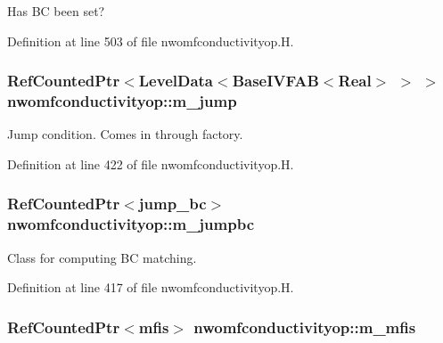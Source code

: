 Has BC been set? 



Definition at line 503 of file nwomfconductivityop.\+H.

\subsubsection[{\texorpdfstring{m\+\_\+jump}{m_jump}}]{\setlength{\rightskip}{0pt plus 5cm}Ref\+Counted\+Ptr$<$Level\+Data$<$Base\+I\+V\+F\+AB$<$Real$>$ $>$ $>$ nwomfconductivityop\+::m\+\_\+jump\hspace{0.3cm}{\ttfamily [protected]}}\hypertarget{classnwomfconductivityop_a094701273aec439e9e0965cedbc348a9}{}\label{classnwomfconductivityop_a094701273aec439e9e0965cedbc348a9}


Jump condition. Comes in through factory. 



Definition at line 422 of file nwomfconductivityop.\+H.

\subsubsection[{\texorpdfstring{m\+\_\+jumpbc}{m_jumpbc}}]{\setlength{\rightskip}{0pt plus 5cm}Ref\+Counted\+Ptr$<${\bf jump\+\_\+bc}$>$ nwomfconductivityop\+::m\+\_\+jumpbc\hspace{0.3cm}{\ttfamily [protected]}}\hypertarget{classnwomfconductivityop_a5a38584a144ef9dffa3c8e0c67dd1ca0}{}\label{classnwomfconductivityop_a5a38584a144ef9dffa3c8e0c67dd1ca0}


Class for computing BC matching. 



Definition at line 417 of file nwomfconductivityop.\+H.

\subsubsection[{\texorpdfstring{m\+\_\+mfis}{m_mfis}}]{\setlength{\rightskip}{0pt plus 5cm}Ref\+Counted\+Ptr$<${\bf mfis}$>$ nwomfconductivityop\+::m\+\_\+mfis\hspace{0.3cm}{\ttfamily [protected]}}\hypertarget{classnwomfconductivityop_acce8fedb84d502e40cb99bb82019fa55}{}\label{classnwomfconductivityop_acce8fedb84d502e40cb99bb82019fa55}


